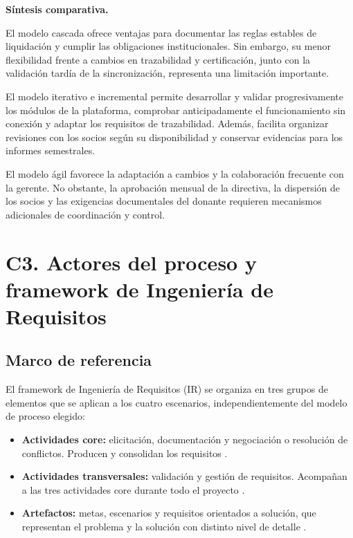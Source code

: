 \documentclass[12pt,a4paper]{article}
\begin{document}
\normalsize

\noindent\textbf{Síntesis comparativa.}

El modelo cascada ofrece ventajas para documentar las reglas estables de liquidación y cumplir las obligaciones institucionales. Sin embargo, su menor flexibilidad frente a cambios en trazabilidad y certificación, junto con la validación tardía de la sincronización, representa una limitación importante.

El modelo iterativo e incremental permite desarrollar y validar progresivamente los módulos de la plataforma, comprobar anticipadamente el funcionamiento sin conexión y adaptar los requisitos de trazabilidad. Además, facilita organizar revisiones con los socios según su disponibilidad y conservar evidencias para los informes semestrales.

El modelo ágil favorece la adaptación a cambios y la colaboración frecuente con la gerente. No obstante, la aprobación mensual de la directiva, la dispersión de los socios y las exigencias documentales del donante requieren mecanismos adicionales de coordinación y control.

\clearpage




\section{C3. Actores del proceso y framework de Ingeniería de Requisitos}

\subsection{Marco de referencia}

El framework de Ingeniería de Requisitos (IR) \cite{Pohl2025,IREB2026} se organiza en tres grupos de elementos que se aplican a los cuatro escenarios, independientemente del modelo de proceso elegido:

\begin{itemize}
    \item \textbf{Actividades core:} elicitación, documentación y negociación o resolución de conflictos. Producen y consolidan los requisitos \cite{Pohl2025}.
    \item \textbf{Actividades transversales:} validación y gestión de requisitos. Acompañan a las tres actividades core durante todo el proyecto \cite{Pohl2025,SWEBOK_v4_2024}.
    \item \textbf{Artefactos:} metas, escenarios y requisitos orientados a solución, que representan el problema y la solución con distinto nivel de detalle \cite{Pohl2025}.
\end{itemize}
\end{document}
